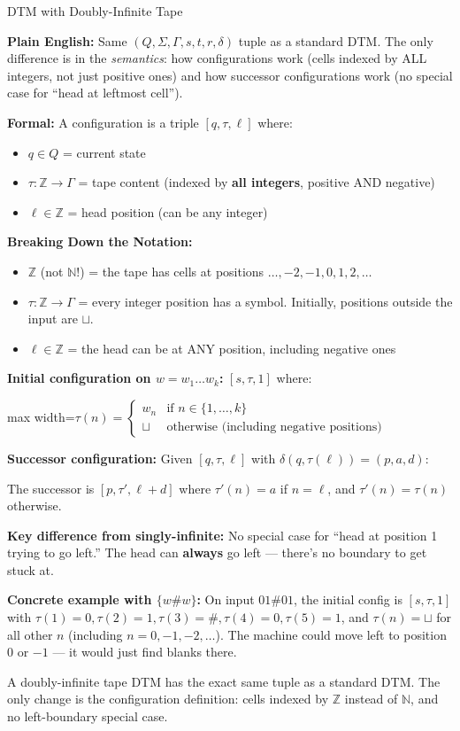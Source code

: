 \documentclass[11pt,a4paper]{article}
\newcommand{\fitmath}[1]{\begin{adjustbox}{max width=\linewidth}$\displaystyle #1$\end{adjustbox}}
\newcommand{\kt}[1]{\par\vspace{0.3em}\colorbox{yellow!60}{\parbox{\dimexpr\linewidth-2\fboxsep}{#1}}\vspace{0.3em}}
\begin{document}
\begin{definitionbox}{{DTM with Doubly-Infinite Tape}}

\textbf{Plain English:} Same $(Q, \Sigma, \Gamma, s, t, r, \delta)$ tuple as a standard DTM. The only difference is in the \textit{semantics}: how configurations work (cells indexed by ALL integers, not just positive ones) and how successor configurations work (no special case for ``head at leftmost cell'').

\textbf{Formal:} A configuration is a triple $[q, \tau, \ell]$ where:
\begin{itemize}[nosep]
\item $q \in Q$ = current state
\item $\tau\colon \mathbb{Z} \to \Gamma$ = tape content (indexed by \textbf{all integers}, positive AND negative)
\item $\ell \in \mathbb{Z}$ = head position (can be any integer)
\end{itemize}

\textbf{Breaking Down the Notation:}
\begin{itemize}[nosep]
\item $\mathbb{Z}$ (not $\mathbb{N}$!) = the tape has cells at positions $\ldots, -2, -1, 0, 1, 2, \ldots$
\item $\tau\colon \mathbb{Z} \to \Gamma$ = every integer position has a symbol. Initially, positions outside the input are $\sqcup$.
\item $\ell \in \mathbb{Z}$ = the head can be at ANY position, including negative ones
\end{itemize}

\textbf{Initial configuration on $w = w_1 \ldots w_k$:} $[s, \tau, 1]$ where:
\fitmath{\tau(n) = \begin{cases} w_n & \text{if } n \in \{1, \ldots, k\} \\ \sqcup & \text{otherwise (including negative positions)} \end{cases}}

\textbf{Successor configuration:} Given $[q, \tau, \ell]$ with $\delta(q, \tau(\ell)) = (p, a, d)$:

The successor is $[p, \tau', \ell + d]$ where $\tau'(n) = a$ if $n = \ell$, and $\tau'(n) = \tau(n)$ otherwise.

\textbf{Key difference from singly-infinite:} No special case for ``head at position 1 trying to go left.'' The head can \textbf{always} go left --- there's no boundary to get stuck at.

\textbf{Concrete example with $\{w\#w\}$:} On input $01\#01$, the initial config is $[s, \tau, 1]$ with $\tau(1)=0, \tau(2)=1, \tau(3)=\#, \tau(4)=0, \tau(5)=1$, and $\tau(n)=\sqcup$ for all other $n$ (including $n=0, -1, -2, \ldots$). The machine could move left to position 0 or $-1$ --- it would just find blanks there.

\kt{A doubly-infinite tape DTM has the exact same tuple as a standard DTM. The only change is the configuration definition: cells indexed by $\mathbb{Z}$ instead of $\mathbb{N}$, and no left-boundary special case.}
\end{definitionbox}
\end{document}
